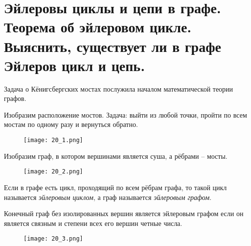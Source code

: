 \section{Эйлеровы циклы и цепи в графе. Теорема об эйлеровом цикле. Выяснить, существует ли в графе 
Эйлеров цикл и цепь.}

Задача о Кёнигсбергских мостах послужила началом математической теории
графов.

Изобразим расположение мостов. Задача: выйти из любой точки, пройти по
всем мостам по одному разу и вернуться обратно.

\begin{figure}[h]
    \centering
    \texttt{[image: 20\_1.png]}
\end{figure}

Изобразим граф, в котором вершинами является суша, а рёбрами -- мосты.

\begin{figure}[h]
    \centering
    \texttt{[image: 20\_2.png]}
\end{figure}

\begin{definition}
    Если в графе есть цикл, проходящий по всем рёбрам графа, то
    такой цикл называется \textit{эйлеровым циклом}, а граф называется \textit{эйлеровым
    графом}.
\end{definition}

\begin{theorem}
    Конечный граф без изолированных вершин является эйлеровым
    графом если он является связным и степени всех его вершин четные числа.
    \begin{figure}[h]
        \centering
        \texttt{[image: 20\_3.png]}
    \end{figure}
\end{theorem}

